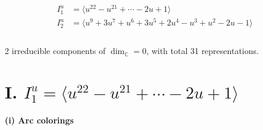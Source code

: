 \documentclass[1p]{elsarticle_modified}
\theoremstyle{definition}
\begin{document}
\begin{align*}
I^u_{1}&=\langle 
u^{22}- u^{21}+\cdots-2 u+1\rangle \\
I^u_{2}&=\langle 
u^9+3 u^7+u^6+3 u^5+2 u^4- u^3+u^2-2 u-1\rangle \\
\\
\end{align*}
\raggedright * 2 irreducible components of $\dim_{\mathbb{C}}=0$, with total 31 representations.\\
\newpage
\renewcommand{\arraystretch}{1}
\centering \section*{I. $I^u_{1}= \langle u^{22}- u^{21}+\cdots-2 u+1 \rangle$}
\flushleft \textbf{(i) Arc colorings}\\
\end{document}
